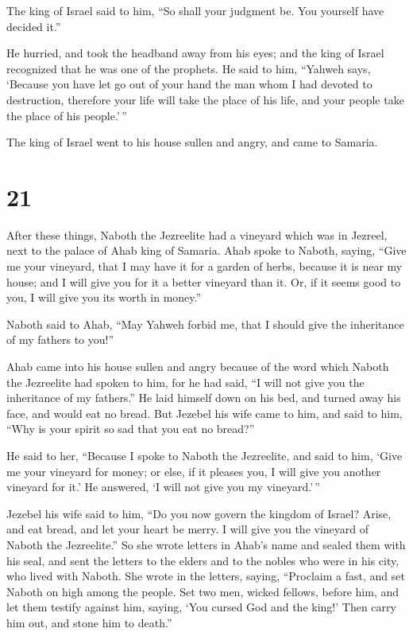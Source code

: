 The king of Israel said to him, ``So shall your judgment be. You
yourself have decided it.''

 He hurried, and took the headband away from his eyes; and
the king of Israel recognized that he was one of the prophets.
 He said to him, ``Yahweh says, `Because you have let go
out of your hand the man whom I had devoted to destruction, therefore
your life will take the place of his life, and your people take the
place of his people.'\,''

 The king of Israel went to his house sullen and angry, and
came to Samaria.

\hypertarget{section-20}{%
\section{21}\label{section-20}}

 After these things, Naboth the Jezreelite had a vineyard
which was in Jezreel, next to the palace of Ahab king of Samaria.
 Ahab spoke to Naboth, saying, ``Give me your vineyard, that
I may have it for a garden of herbs, because it is near my house; and I
will give you for it a better vineyard than it. Or, if it seems good to
you, I will give you its worth in money.''

 Naboth said to Ahab, ``May Yahweh forbid me, that I should
give the inheritance of my fathers to you!''

 Ahab came into his house sullen and angry because of the
word which Naboth the Jezreelite had spoken to him, for he had said, ``I
will not give you the inheritance of my fathers.'' He laid himself down
on his bed, and turned away his face, and would eat no bread.
 But Jezebel his wife came to him, and said to him, ``Why is
your spirit so sad that you eat no bread?''

 He said to her, ``Because I spoke to Naboth the Jezreelite,
and said to him, `Give me your vineyard for money; or else, if it
pleases you, I will give you another vineyard for it.' He answered, `I
will not give you my vineyard.'\,''

 Jezebel his wife said to him, ``Do you now govern the
kingdom of Israel? Arise, and eat bread, and let your heart be merry. I
will give you the vineyard of Naboth the Jezreelite.''  So
she wrote letters in Ahab's name and sealed them with his seal, and sent
the letters to the elders and to the nobles who were in his city, who
lived with Naboth.  She wrote in the letters, saying,
``Proclaim a fast, and set Naboth on high among the people.
 Set two men, wicked fellows, before him, and let them
testify against him, saying, `You cursed God and the king!' Then carry
him out, and stone him to death.''

